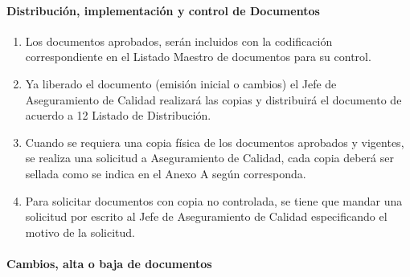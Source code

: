 \paragraph{Distribución, implementación y control de Documentos}

\begin{enumerate}
	\item Los documentos aprobados, serán incluidos con la codificación correspondiente en el Listado Maestro de documentos para su control.
	\item Ya liberado el documento (emisión inicial o cambios) el Jefe de Aseguramiento de Calidad realizará las copias y distribuirá el documento de acuerdo a 12 Listado de Distribución.
	\item Cuando se requiera una copia física de los documentos aprobados y vigentes, se realiza una solicitud a Aseguramiento de Calidad, cada copia deberá ser sellada como se indica en el Anexo A según corresponda.
	\item Para solicitar documentos con copia no controlada, se tiene que mandar una solicitud por escrito al Jefe de Aseguramiento de Calidad especificando el motivo de la solicitud.
\end{enumerate}

\paragraph{Cambios, alta o baja de documentos}

